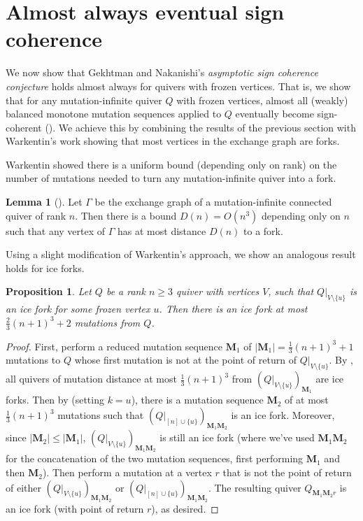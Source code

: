 \documentclass[12pt]{amsart}
\newtheorem{prop}[thm]{Proposition}
\theoremstyle{definition}
\newtheorem{lemma}[thm]{Lemma}
\theoremstyle{remark}
\numberwithin{equation}{section}
\newcommand{\cut}{\setminus}
\begin{document}
\section{Almost always eventual sign coherence}
\label{sec:wander}

We now show that Gekhtman and Nakanishi's \emph{asymptotic sign coherence conjecture} holds almost always for quivers with frozen vertices.  That is, we show that for any mutation-infinite quiver $Q$ with frozen vertices, almost all (weakly) balanced monotone mutation sequences applied to $Q$ eventually become sign-coherent (). We achieve this by combining the results of the previous section with Warkentin's work showing that most vertices in the exchange graph are forks.  


Warkentin showed there is a uniform bound (depending only on rank) on the number of mutations needed to turn any mutation-infinite quiver into a fork.

\begin{lemma}[{\cite[Theorem 5.1]{Warkentin}}]\label{lem: fork in finite mutations}
Let $\Gamma$ be the exchange graph of a mutation-infinite connected quiver of rank $n$.  Then there is a bound $D(n) = O(n^3)$ depending only on $n$ such that any vertex of $\Gamma$ has at most distance $D(n)$ to a fork.    
\end{lemma}

Using a slight modification of Warkentin's approach, we show an analogous result holds for ice forks.  

\begin{prop}\label{prop: add frozen to ice fork}
Let $Q$ be a rank $n \geq 3$ quiver with vertices $V$, such that $Q|_{V \cut \{u\}}$ is an ice fork for some frozen vertex $u$.
Then there is an ice fork at most $\frac{2}{3}(n+1)^3 + 2$ mutations from $Q$. 
\end{prop}
\begin{proof}
First, perform a reduced mutation sequence $\mathbf M_1$ of $|\mathbf M_1| = \frac{1}{3}(n+1)^3 + 1$ mutations to $Q$ whose first mutation is not at the point of return of $Q|_{V\cut \{u\}}$.  
By , all quivers of mutation distance at most $\frac{1}{3}(n+1)^3$ from $(Q|_{V \cut \{u\}})_{\mathbf M_1}$ are ice forks.  
Then by \cite[Corollary 3.10]{Warkentin} (setting $k = u$), there is a mutation sequence $\mathbf M_2$ of at most $\frac{1}{3}(n+1)^3$ mutations such that $(Q|_{[n] \cup \{u\}})_{\mathbf{M}_1 \mathbf M_2}$ is an ice fork.  Moreover, since $|\mathbf M_2| \leq |\mathbf M_1|$, $(Q|_{V \cut \{u\}})_{\mathbf{M}_1 \mathbf{M}_2}$ is still an ice fork (where we've used $\mathbf{M}_1 \mathbf{M}_2$ for the concatenation of the two mutation sequences, first performing $\mathbf{M}_1$ and then $\mathbf{M}_2$).  
Then perform a mutation at a vertex $r$ that is not the point of return of either $(Q|_{V \cut \{u\}})_{\mathbf{M}_1 \mathbf{M}_2}$ or $(Q|_{[n] \cup \{u\}})_{\mathbf{M}_1 \mathbf{M}_2}$. The resulting quiver $Q_{\mathbf{M}_1\mathbf{M}_2r}$ is an ice fork (with point of return $r$), as desired.
\end{proof}
\end{document}
